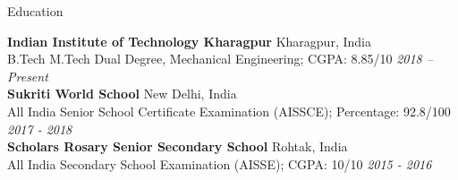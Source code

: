 \documentclass[40]{resume} %
\begin{document}
\begin{rSection}{Education}
\vspace{0.3cm}

{\bf Indian Institute of Technology Kharagpur } \hfill { Kharagpur, India} 
\\ B.Tech M.Tech Dual Degree, Mechanical Engineering; CGPA: 8.85/10 \hfill { \em  2018 – Present}
\vspace{0.2cm}
\\
{\bf Sukriti World School } \hfill { New Delhi, India} 
\\ All India Senior School Certificate Examination (AISSCE); Percentage: 92.8/100 \hfill { \em  2017 - 2018}
\vspace{0.2cm}
\\
{\bf Scholars Rosary Senior Secondary School } \hfill { Rohtak, India} 
\\ All India Secondary School Examination (AISSE); CGPA: 10/10 \hfill { \em  2015 - 2016}

\end{rSection}


\end{document}
